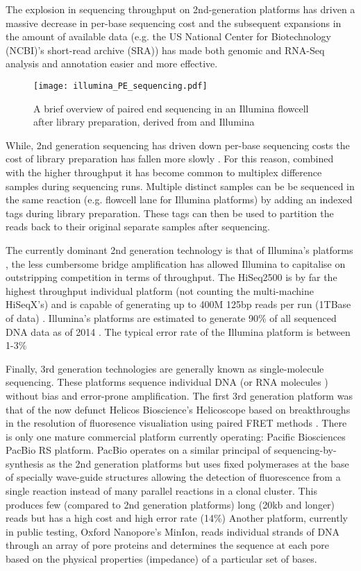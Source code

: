 The explosion in sequencing throughput on 2nd-generation platforms has driven a massive decrease in per-base sequencing cost
and the subsequent expansions in the amount of available data (e.g. the US National Center for Biotechnology (NCBI)'s short-read archive (SRA)) 
has made both genomic and RNA-Seq analysis and annotation easier and more effective. 

\begin{figure}
    \texttt{[image: illumina\_PE\_sequencing.pdf]}
    \label{fig:libseq}
    \caption{A brief overview of paired end sequencing in an Illumina flowcell after library preparation, derived
    from \citep{Mardis2008} and Illumina}
\end{figure}

While, 2nd generation sequencing has driven down per-base sequencing costs the cost of library preparation 
has fallen more slowly \citep{Blainey2013}.
For this reason, combined with the higher throughput it has become common to multiplex difference samples 
during sequencing runs.  Multiple distinct samples can be be sequenced
in the same reaction (e.g. flowcell lane for Illumina platforms) by adding an indexed tags during library
preparation.  These tags can then be used to partition the reads back to their original separate samples
after sequencing. 


The currently dominant 2nd generation technology is that of Illumina's platforms \citep{Regalado2014}, the less cumbersome bridge amplification \citep{Shendure2008} 
has allowed Illumina to capitalise on outstripping competition in terms of throughput.
The HiSeq2500 is by far the highest throughput individual platform (not counting the multi-machine HiSeqX's) and is capable of generating up to 
400M 125bp reads per run (1TBase of data) \citep{Nederbragt2013}.
Illumina's platforms are estimated to generate 90\% of all sequenced DNA data as of 2014 \citep{Regalado2014}.
The typical error rate of the Illumina platform is between 1-3\% \citep{Wang2012}


Finally, 3rd generation technologies are generally known as single-molecule sequencing.
These platforms sequence individual DNA (or RNA molecules \citep{Ozsolak2009}) without
bias and error-prone amplification. 
The first 3rd generation platform was that of the now defunct Helicos Bioscience's Helicoscope \citep{Harris2008}
based on breakthroughs in the resolution of fluoresence visualiation using paired FRET methods \citep{Braslavsky2003}.
There is only one mature commercial platform currently operating: Pacific Biosciences PacBio RS platform. PacBio operates on a similar principal
of sequencing-by-synthesis as the 2nd generation platforms but uses fixed polymerases at the base
of specially wave-guide structures allowing the detection of fluorescence from a single reaction
instead of many parallel reactions in a clonal cluster.  This produces few (compared to 2nd generation 
platforms) long (20kb and longer) reads but has a high cost and high error rate (14\%) \citep{Jaszczyszyn2014}
Another platform, currently in public testing, Oxford Nanopore's MinIon, reads individual strands of DNA through an array of 
pore proteins and determines the sequence at each pore based on the physical
properties (impedance) of a particular set of bases.

